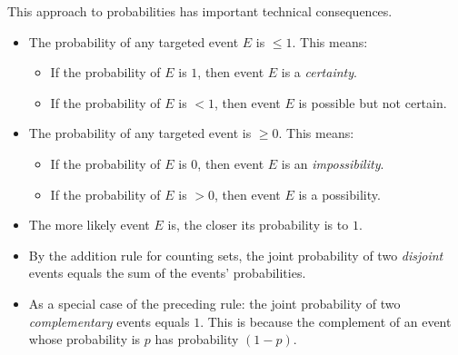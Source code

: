 \noindent
This approach to probabilities has important technical consequences.
  \begin{itemize}
  \item
The probability of any targeted event $E$ is $\leq 1$.  This means:
    \begin{itemize}
    \item
If the probability of $E$ is $1$, then event $E$ is a {\em certainty}.
    \medskip\item
If the probability of $E$ is $< 1$, then event $E$ is possible but not certain.
   \end{itemize}

 \medskip\item
The probability of any targeted event is $\geq 0$.   This means:
    \begin{itemize}
    \item
If the probability of $E$ is $0$, then event $E$ is an {\em impossibility}.
    \medskip\item
If the probability of $E$ is $> 0$, then event $E$ is a possibility.
   \end{itemize}

  \medskip\item
The more likely event $E$ is, the closer its probability is to $1$.
  \medskip\item
By the addition rule for counting sets, the joint probability of two {\em disjoint} events equals the sum of the events' probabilities.
  \medskip\item
As a special case of the preceding rule: the joint probability of two {\em complementary} events
equals $1$.  This is because the complement of an event whose probability is $p$ has
probability  $(1-p)$.
  \end{itemize}

\bigskip

\noindent {}

